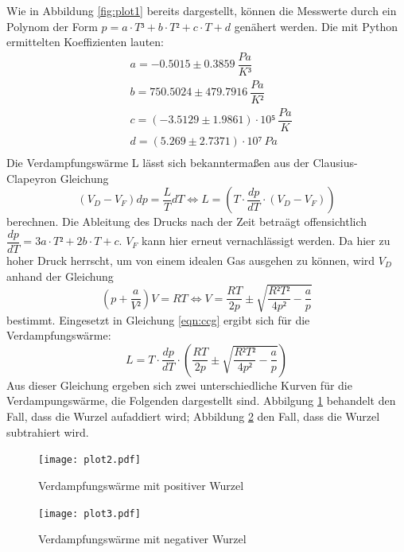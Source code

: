   \noindent Wie in Abbildung \ref{fig:plot1} bereits dargestellt, können die Messwerte durch ein Polynom
  der Form $p = a \cdot T³ + b \cdot T² + c \cdot T + d$ genähert werden. Die mit Python
  ermittelten Koeffizienten lauten:
  \begin{align*}
    & a = -0.5015 \pm 0.3859 \ \dfrac{Pa}{K³}\\
    & b = 750.5024 \pm 479.7916 \ \dfrac{Pa}{K²}\\
    & c = (-3.5129 \pm 1.9861) \cdot 10⁵ \ \dfrac{Pa}{K}\\
    & d = (5.269 \pm 2.7371) \cdot 10⁷ \ Pa\\
  \end{align*}
  Die Verdampfungswärme L lässt sich bekanntermaßen aus der Clausius-Clapeyron Gleichung 
  \begin{equation}
    \label{eqn:ccg}
    (V_D-V_F)dp = \dfrac{L}{T}dT \Leftrightarrow L = (T \cdot \dfrac{dp}{dT}\cdot(V_D-V_F)) 
  \end{equation}
  berechnen.
  Die Ableitung des Drucks nach der Zeit betraägt offensichtlich $\dfrac{dp}{dT}= 3a \cdot
  T²+2b\cdot T+ c$. $V_F$ kann hier erneut vernachlässigt werden.
  Da hier zu hoher Druck herrscht, um von einem idealen Gas ausgehen zu können, wird 
  $V_D$ anhand der Gleichung
  \begin{equation*}
  (p+\dfrac{a}{V²})V = RT \Leftrightarrow V = \dfrac{RT}{2p} \pm \sqrt{\dfrac{R²T²}{4p²}-\dfrac{a}{p}}
  \end{equation*}
  bestimmt. Eingesetzt in Gleichung \ref{eqn:ccg} ergibt sich für die Verdampfungswärme:
  \begin{equation*}
  L = T \cdot \dfrac{dp}{dT} \cdot (\dfrac{RT}{2p} \pm \sqrt{\dfrac{R²T²}{4p²}-\dfrac{a}{p}})
  \end{equation*}
  Aus dieser Gleichung ergeben sich zwei unterschiedliche Kurven für die Verdampungswärme, die
  Folgenden dargestellt sind. Abbilgung \ref{fig:plot2} behandelt den Fall, dass die Wurzel aufaddiert wird; 
  Abbildung \ref{fig:plot3} den Fall, dass die Wurzel subtrahiert wird.
  \begin{figure}[H]
   \centering
   \texttt{[image: plot2.pdf]}
   \caption{Verdampfungswärme mit positiver Wurzel}
   \label{fig:plot2}
  \end{figure}
  
  \begin{figure}[H]
   \centering
   \texttt{[image: plot3.pdf]}
   \caption{Verdampfungswärme mit negativer Wurzel}
   \label{fig:plot3}
  \end{figure}

  
  







